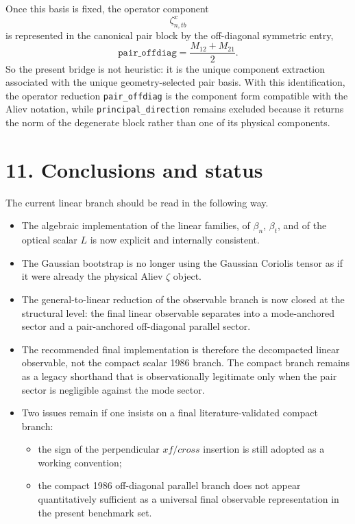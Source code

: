 \documentclass[11pt]{article}
\begin{document}
Once this basis is fixed, the operator component
\[
\zeta^x_{n,tb}
\]
is represented in the canonical pair block by the off-diagonal symmetric entry,
\[
\texttt{pair\_offdiag}=\frac{M_{12}+M_{21}}{2}.
\]
So the present bridge is not heuristic: it is the unique component extraction
associated with the unique geometry-selected pair basis. With this
identification, the operator reduction \texttt{pair\_offdiag} is the component
form compatible with the Aliev notation, while
\texttt{principal\_direction} remains excluded because it returns the norm of
the degenerate block rather than one of its physical components.

\section*{11. Conclusions and status}

The current linear branch should be read in the following way.

\begin{itemize}
\item The algebraic implementation of the linear families, of $\beta_n$,
$\beta_t$, and of the optical scalar $L$ is now explicit and internally
consistent.
\item The Gaussian bootstrap is no longer using the Gaussian Coriolis tensor as
if it were already the physical Aliev $\zeta$ object.
\item The general-to-linear reduction of the observable branch is now closed at
the structural level: the final linear observable separates into a
mode-anchored sector and a pair-anchored off-diagonal parallel sector.
\item The recommended final implementation is therefore the decompacted linear
observable, not the compact scalar 1986 branch. The compact branch remains as a
legacy shorthand that is observationally legitimate only when the pair sector
is negligible against the mode sector.
\item Two issues remain if one insists on a final literature-validated compact
branch:
  \begin{itemize}
  \item the sign of the perpendicular $xf/cross$ insertion is still adopted as
  a working convention;
  \item the compact 1986 off-diagonal parallel branch does not appear
  quantitatively sufficient as a universal final observable representation in
  the present benchmark set.
  \end{itemize}
\end{itemize}
\end{document}
